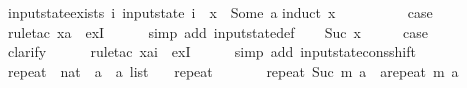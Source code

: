 \begin{isabellebody}
\isamarkupfalse%
%
\endisatagproof
{\isafoldproof}%
%
\isadelimproof
\isanewline
%
\endisadelimproof
\isanewline
{}\isamarkupfalse%
\ input{}state{\isacharunderscore}exists{\isacharcolon}\ {\isachardoublequoteopen}{\isasymexists}i{\isachardot}\ input{}state\ i\ {\isachardollar}\ x{}\ {\isacharequal}\ Some\ a{\isachardoublequoteclose}\isanewline
%
\isadelimproof
%
\endisadelimproof
%
\isatagproof
{}\isamarkupfalse%
{\isacharparenleft}induct\ x{}{\isacharparenright}\isanewline
\ \ \isamarkupfalse%
\ {}\isanewline
\ \ \isamarkupfalse%
\ \isamarkupfalse%
\ {\isacharquery}case\isanewline
\ \ \ \ \isamarkupfalse%
\ {\isacharparenleft}rule{\isacharunderscore}tac\ x{\isacharequal}{\isachardoublequoteopen}{\isacharbrackleft}a{\isacharbrackright}{\isachardoublequoteclose}\ \ exI{\isacharparenright}\isanewline
\ \ \ \ \isamarkupfalse%
\ {\isacharparenleft}simp\ add{\isacharcolon}\ input{}state{\isacharunderscore}def{\isacharparenright}\isanewline
{}\isamarkupfalse%
\isanewline
\ \ \isamarkupfalse%
\ {\isacharparenleft}Suc\ x{}{\isacharparenright}\isanewline
\ \ \isamarkupfalse%
\ \isamarkupfalse%
\ {\isacharquery}case\isanewline
\ \ \ \ \isamarkupfalse%
\ clarify\isanewline
\ \ \ \ \isamarkupfalse%
\ {\isacharparenleft}rule{\isacharunderscore}tac\ x{\isacharequal}{\isachardoublequoteopen}a{\isacharhash}i{\isachardoublequoteclose}\ \ exI{\isacharparenright}\isanewline
\ \ \ \ \isamarkupfalse%
\ {\isacharparenleft}simp\ add{\isacharcolon}\ input{}state{\isacharunderscore}cons{\isacharunderscore}shift{\isacharparenright}\isanewline
{}\isamarkupfalse%
%
\endisatagproof
{\isafoldproof}%
%
\isadelimproof
\isanewline
%
\endisadelimproof
\isanewline
{}\isamarkupfalse%
\ repeat\ {\isacharcolon}{\isacharcolon}\ {\isachardoublequoteopen}nat\ {\isasymRightarrow}\ {\isacharprime}a\ {\isasymRightarrow}\ {\isacharprime}a\ list{\isachardoublequoteclose}\ \isanewline
\ \ {\isachardoublequoteopen}repeat\ {}\ {\isacharunderscore}\ {\isacharequal}\ {\isacharbrackleft}{\isacharbrackright}{\isachardoublequoteclose}\ {\isacharbar}\isanewline
\ \ {\isachardoublequoteopen}repeat\ {\isacharparenleft}Suc\ m{\isacharparenright}\ a\ {\isacharequal}\ a{\isacharhash}{\isacharparenleft}repeat\ m\ a{\isacharparenright}{\isachardoublequoteclose}\isanewline

\end{isabellebody}
